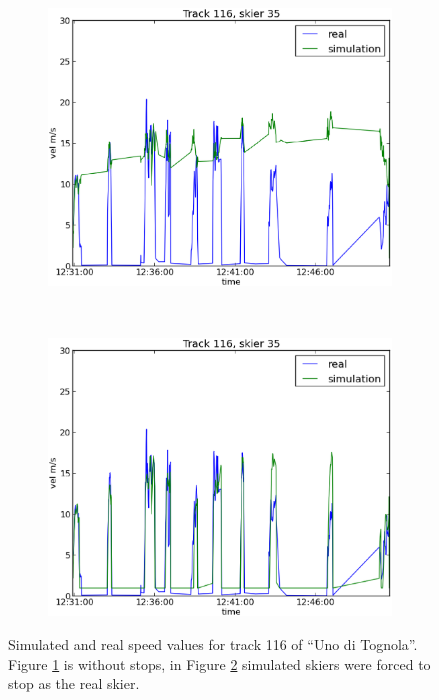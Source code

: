 \documentclass[12pt,a4paper,twoside]{book}
\begin{document}
\begin{figure}[!h]
        \centering
        \begin{subfigure}[b]{0.5\textwidth}
                \centering
                \includegraphics[width=\textwidth]{images/sm_track116.eps}
                \caption{}
                \label{Sno_stops}
        \end{subfigure}%
        ~ %
        \begin{subfigure}[b]{0.5\textwidth}
                \centering
                \includegraphics[width=\textwidth]{images/sm_stops_track116.eps}
                \caption{}
                \label{Sstops}
        \end{subfigure}
        \caption{Simulated and real speed values for track 116 of ``Uno di Tognola''. Figure \ref{Sno_stops} is without stops, in Figure \ref{Sstops} simulated skiers were forced to stop as the real skier.}\label{sm_stops_track116}
\end{figure}
\end{document}
